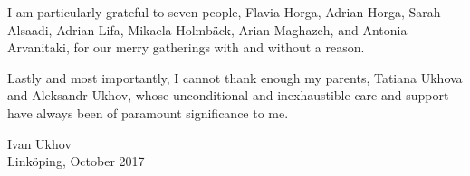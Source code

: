I am particularly grateful to seven people, Flavia Horga, Adrian Horga, Sarah
Alsaadi, Adrian Lifa, Mikaela Holmbäck, Arian Maghazeh, and Antonia Arvanitaki,
for our merry gatherings with and without a reason.

Lastly and most importantly, I cannot thank enough my parents, Tatiana Ukhova
and Aleksandr Ukhov, whose unconditional and inexhaustible care and support have
always been of paramount significance to me.

\vspace{4em}
\hfill
\noindent
\begin{minipage}{0.35\textwidth}
  Ivan Ukhov\\
  Linköping, October 2017
\end{minipage}
